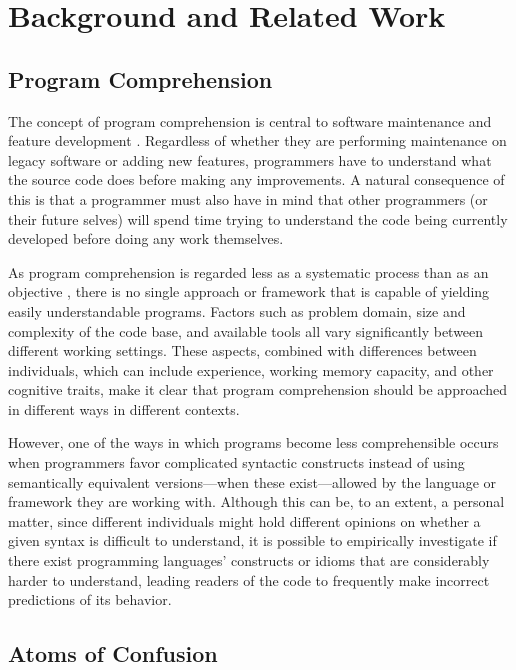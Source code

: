 \section{Background and Related Work}
\label{back}
\subsection{Program Comprehension}


The concept of program comprehension is central to software maintenance and feature development \cite{DBLP:conf/iwpc/TilleySP96}. Regardless of whether they are performing maintenance on legacy software or adding new features, programmers have to understand what the source code does before making any improvements. A natural consequence of this is that a programmer must also have in mind that other programmers (or their future selves) 
will
spend time trying to understand the code being currently developed before doing any work themselves.

As program comprehension is regarded less as a systematic process than as an objective \cite{DBLP:journals/ibmsj/OHareT94}, there is no single approach or framework that is capable of yielding easily understandable programs. Factors such as problem domain, size and complexity of the code base, and available tools all vary significantly between different working settings. These aspects, combined with differences between individuals, which can include experience, working memory capacity, and other cognitive traits, make it clear that program comprehension should be approached in different ways in different contexts. 

However, one of the ways in which programs become less comprehensible occurs when programmers favor complicated syntactic constructs instead of using semantically equivalent versions---when these exist---allowed by the language or framework they are working with. Although this can be, to an extent, a personal matter, since different individuals might hold different opinions on whether a given syntax is difficult to understand, it is possible to empirically investigate if there exist programming languages' constructs or idioms that are considerably harder to understand, leading readers of the code to frequently make incorrect predictions of its behavior. 

\subsection{Atoms of Confusion}\label{sec:aoc}

